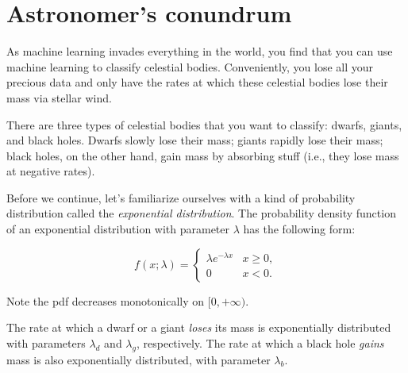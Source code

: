 \documentclass{article}
\newcommand{\Question}[1]{\Large \section{ #1 } \normalsize}
\begin{document}
\newpage
\Question{Astronomer's conundrum}

As machine learning invades everything in the world, you find that you can use machine learning to classify celestial bodies. Conveniently, you lose all your precious data and only have the rates at which these celestial bodies lose their mass via stellar wind.

There are three types of celestial bodies that you want to classify: dwarfs, giants, and black holes. Dwarfs slowly lose their mass; giants rapidly lose their mass; black holes, on the other hand, gain mass by absorbing stuff (i.e., they lose mass at negative rates). 

Before we continue, let's familiarize ourselves with a kind of probability distribution called the \textit{exponential distribution}. The probability density function of an exponential distribution with parameter $\lambda$ has the following form:

\[
f(x; \lambda) =
  \begin{cases}
  \lambda e^{-\lambda x} & x \ge 0, \\
  0                      & x < 0.
\end{cases}
\]

Note the pdf decreases monotonically on $[0, +\infty)$.

The rate at which a dwarf or a giant \textit{loses} its mass is exponentially distributed with parameters $\lambda_d$ and $\lambda_g$, respectively. The rate at which a black hole \textit{gains} mass is also exponentially distributed, with parameter $\lambda_b$.
\end{document}
